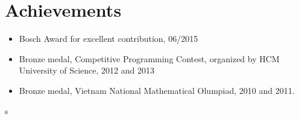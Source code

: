 \section*{Achievements}
\begin{itemize}
  \item Bosch Award for excellent contribution, 06/2015
  \item Bronze medal, Competitive Programming Contest, organized by HCM University of Science, 2012 and 2013
  \item Bronze medal, Vietnam National Mathematical Olumpiad, 2010 and 2011. 
\end{itemize}s